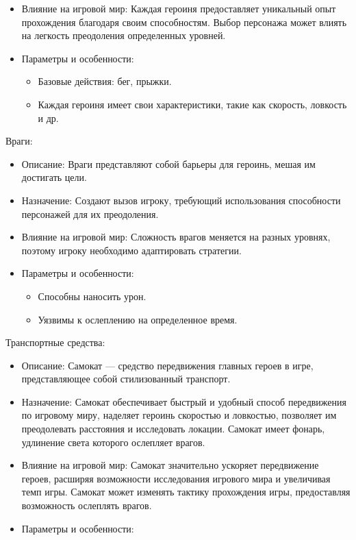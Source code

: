 \documentclass[article,12pt, fleqn]{article}
\begin{document}
\begin{itemize}
\begin{itemize}
        \item Влияние на игровой мир: Каждая героиня предоставляет уникальный опыт прохождения благодаря своим способностям. Выбор персонажа может влиять на легкость преодоления определенных уровней.
        \item Параметры и особенности: 
        \begin{itemize}
            \item Базовые действия: бег, прыжки.
            \item Каждая героиня имеет свои характеристики, такие как скорость, ловкость и др.
        \end{itemize}
    \end{itemize}
Враги: 
    \begin{itemize}
        \item Описание: Враги представляют собой барьеры для героинь, мешая им достигать цели.
        \item Назначение: Создают вызов игроку, требующий использования способности персонажей для их преодоления.
        \item Влияние на игровой мир: Сложность врагов меняется на разных уровнях, поэтому игроку необходимо адаптировать стратегии.
        \item Параметры и особенности: 
        \begin{itemize}
            \item Способны наносить урон.
            \item Уязвимы к ослеплению на определенное время.
        \end{itemize}
    \end{itemize}
Транспортные средства:
\begin{itemize}
        \item Описание: Самокат — средство передвижения главных героев в игре, представляющее собой стилизованный транспорт.
        \item Назначение: Самокат обеспечивает быстрый и удобный способ передвижения по игровому миру, наделяет героинь скоростью и ловкостью, позволяет им преодолевать расстояния и исследовать локации. Самокат имеет фонарь, удлинение света которого ослепляет врагов.
        \item Влияние на игровой мир: Самокат значительно ускоряет передвижение героев, расширяя возможности исследования игрового мира и увеличивая темп игры. Самокат может изменять тактику прохождения игры, предоставляя возможность ослеплять врагов.
        \item Параметры и особенности: 

\end{itemize}
\end{itemize}
\end{document}
